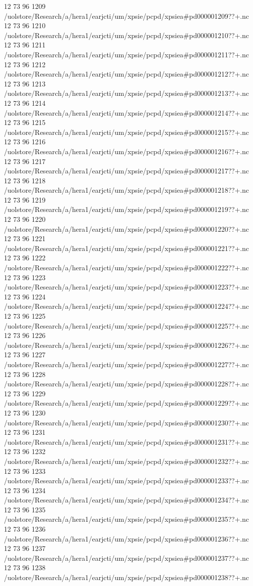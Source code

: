 12 73 96
1209
/uolstore/Research/a/hera1/earjcti/um/xpsie/pcpd/xpsiea#pd000001209??+.nc
12 73 96
1210
/uolstore/Research/a/hera1/earjcti/um/xpsie/pcpd/xpsiea#pd000001210??+.nc
12 73 96
1211
/uolstore/Research/a/hera1/earjcti/um/xpsie/pcpd/xpsiea#pd000001211??+.nc
12 73 96
1212
/uolstore/Research/a/hera1/earjcti/um/xpsie/pcpd/xpsiea#pd000001212??+.nc
12 73 96
1213
/uolstore/Research/a/hera1/earjcti/um/xpsie/pcpd/xpsiea#pd000001213??+.nc
12 73 96
1214
/uolstore/Research/a/hera1/earjcti/um/xpsie/pcpd/xpsiea#pd000001214??+.nc
12 73 96
1215
/uolstore/Research/a/hera1/earjcti/um/xpsie/pcpd/xpsiea#pd000001215??+.nc
12 73 96
1216
/uolstore/Research/a/hera1/earjcti/um/xpsie/pcpd/xpsiea#pd000001216??+.nc
12 73 96
1217
/uolstore/Research/a/hera1/earjcti/um/xpsie/pcpd/xpsiea#pd000001217??+.nc
12 73 96
1218
/uolstore/Research/a/hera1/earjcti/um/xpsie/pcpd/xpsiea#pd000001218??+.nc
12 73 96
1219
/uolstore/Research/a/hera1/earjcti/um/xpsie/pcpd/xpsiea#pd000001219??+.nc
12 73 96
1220
/uolstore/Research/a/hera1/earjcti/um/xpsie/pcpd/xpsiea#pd000001220??+.nc
12 73 96
1221
/uolstore/Research/a/hera1/earjcti/um/xpsie/pcpd/xpsiea#pd000001221??+.nc
12 73 96
1222
/uolstore/Research/a/hera1/earjcti/um/xpsie/pcpd/xpsiea#pd000001222??+.nc
12 73 96
1223
/uolstore/Research/a/hera1/earjcti/um/xpsie/pcpd/xpsiea#pd000001223??+.nc
12 73 96
1224
/uolstore/Research/a/hera1/earjcti/um/xpsie/pcpd/xpsiea#pd000001224??+.nc
12 73 96
1225
/uolstore/Research/a/hera1/earjcti/um/xpsie/pcpd/xpsiea#pd000001225??+.nc
12 73 96
1226
/uolstore/Research/a/hera1/earjcti/um/xpsie/pcpd/xpsiea#pd000001226??+.nc
12 73 96
1227
/uolstore/Research/a/hera1/earjcti/um/xpsie/pcpd/xpsiea#pd000001227??+.nc
12 73 96
1228
/uolstore/Research/a/hera1/earjcti/um/xpsie/pcpd/xpsiea#pd000001228??+.nc
12 73 96
1229
/uolstore/Research/a/hera1/earjcti/um/xpsie/pcpd/xpsiea#pd000001229??+.nc
12 73 96
1230
/uolstore/Research/a/hera1/earjcti/um/xpsie/pcpd/xpsiea#pd000001230??+.nc
12 73 96
1231
/uolstore/Research/a/hera1/earjcti/um/xpsie/pcpd/xpsiea#pd000001231??+.nc
12 73 96
1232
/uolstore/Research/a/hera1/earjcti/um/xpsie/pcpd/xpsiea#pd000001232??+.nc
12 73 96
1233
/uolstore/Research/a/hera1/earjcti/um/xpsie/pcpd/xpsiea#pd000001233??+.nc
12 73 96
1234
/uolstore/Research/a/hera1/earjcti/um/xpsie/pcpd/xpsiea#pd000001234??+.nc
12 73 96
1235
/uolstore/Research/a/hera1/earjcti/um/xpsie/pcpd/xpsiea#pd000001235??+.nc
12 73 96
1236
/uolstore/Research/a/hera1/earjcti/um/xpsie/pcpd/xpsiea#pd000001236??+.nc
12 73 96
1237
/uolstore/Research/a/hera1/earjcti/um/xpsie/pcpd/xpsiea#pd000001237??+.nc
12 73 96
1238
/uolstore/Research/a/hera1/earjcti/um/xpsie/pcpd/xpsiea#pd000001238??+.nc
